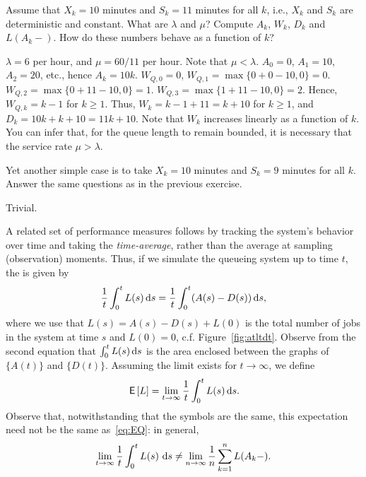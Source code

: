 \begin{exercise}
 Assume that $X_k = 10$ minutes and $S_k = 11$ minutes for all
    $k$, i.e., $X_k$ and $S_k$ are deterministic and constant. What
    are $\lambda$ and $\mu$?  Compute $A_k$, $W_k$, $D_k$ and
    $L(A_k-)$. How do these numbers behave as a function of $k$?
  \begin{solution}
 $\lambda=6$ per hour, and $\mu=60/11$ per hour. Note that
      $\mu < \lambda$. $A_0 = 0$, $A_1=10$, $A_2=20$, etc., hence
      $A_k = 10k$. $W_{Q,0} = 0$, $W_{Q,1} = \max\{0 + 0-10,0\} = 0$.
      $W_{Q,2} = \max\{0+11-10,0\} =1$.
      $W_{Q,3} = \max\{1+11-10,0\} =2$. Hence, $W_{Q,k} = k-1$ for
      $k\geq1$. Thus, $W_k = k-1+11 = k + 10$ for $k\geq1$, and
      $D_k = 10k + k+10 = 11k+10$. Note that $W_k$ increases linearly
      as a function of $k$.  You can infer that, for the queue length
      to remain bounded, it is necessary that the service rate
      $\mu > \lambda$.
  \end{solution}
\end{exercise}


\begin{exercise}
 Yet another simple case is to take $X_k=10$ minutes and
    $S_k=9$ minutes for all $k$. Answer the same questions as in the
    previous exercise.
  \begin{solution}
 Trivial.
  \end{solution}
\end{exercise}


A related set of performance measures follows by tracking the system's
behavior over time and taking the \emph{time-average}, rather than the
average at sampling (observation) moments. Thus, if we simulate the
queueing system up to time $t$, the  is given by
\begin{equation}\label{eq:11}
\frac 1 t\int_0^t L(s)\,\text{d}s =  \frac 1 t\int_0^t (A(s)-D(s)) \,\text{d}s,
\end{equation}
where we use that $L(s)=A(s) - D(s) + L(0)$ is the total number of jobs in
the system at time $s$ and $L(0)=0$, c.f. Figure~\ref{fig:atltdt}.  Observe from the second equation that $\int_0^t L(s)\,\text{d}s$ is the area enclosed between the graphs of $\{A(t)\}$
and $\{D(t)\}$. Assuming the limit exists for $t\to\infty$, we define
\begin{equation}
  \label{eq:46}
  \,\mathsf{E}\left[L\right] = \lim_{t\to\infty} \frac 1 t\int_0^t L(s) \,\text{d}s. 
\end{equation}
Observe that, notwithstanding that the symbols are the same, this
expectation need not be the same as~\eqref{eq:EQ}: in general,
\begin{equation*}
  \lim_{t\to\infty} \frac 1 t\int_0^t L(s)\, \,\text{d}s \neq   \lim_{n\to\infty}\frac 1n  \sum_{k=1}^n L(A_k-).
\end{equation*}

